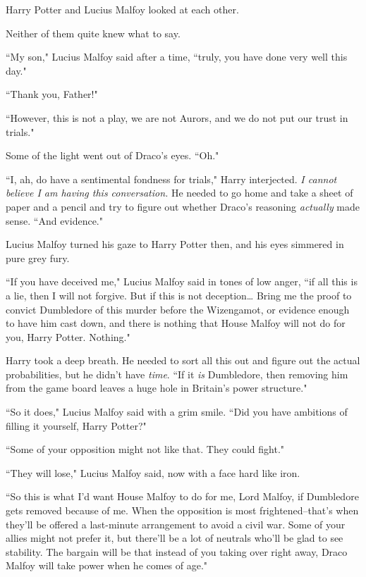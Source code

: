 Harry Potter and Lucius Malfoy looked at each other.

Neither of them quite knew what to say.

``My son," Lucius Malfoy said after a time, ``truly, you have done very well this day."

``Thank you, Father!"

``However, this is not a play, we are not Aurors, and we do not put our trust in trials."

Some of the light went out of Draco's eyes. ``Oh."

``I, ah, do have a sentimental fondness for trials," Harry interjected. \emph{I cannot believe I am having this conversation.} He needed to go home and take a sheet of paper and a pencil and try to figure out whether Draco's reasoning \emph{actually} made sense. ``And evidence."

Lucius Malfoy turned his gaze to Harry Potter then, and his eyes simmered in pure grey fury.

``If you have deceived me," Lucius Malfoy said in tones of low anger, ``if all this is a lie, then I will not forgive. But if this is not deception{\ldots} Bring me the proof to convict Dumbledore of this murder before the Wizengamot, or evidence enough to have him cast down, and there is nothing that House Malfoy will not do for you, Harry Potter. Nothing."

Harry took a deep breath. He needed to sort all this out and figure out the actual probabilities, but he didn't have \emph{time}. ``If it \emph{is} Dumbledore, then removing him from the game board leaves a huge hole in Britain's power structure."

``So it does," Lucius Malfoy said with a grim smile. ``Did you have ambitions of filling it yourself, Harry Potter?"

``Some of your opposition might not like that. They could fight."

``They will lose," Lucius Malfoy said, now with a face hard like iron.

``So this is what I'd want House Malfoy to do for me, Lord Malfoy, if Dumbledore gets removed because of me. When the opposition is most frightened\---that's when they'll be offered a last-minute arrangement to avoid a civil war. Some of your allies might not prefer it, but there'll be a lot of neutrals who'll be glad to see stability. The bargain will be that instead of you taking over right away, Draco Malfoy will take power when he comes of age."

